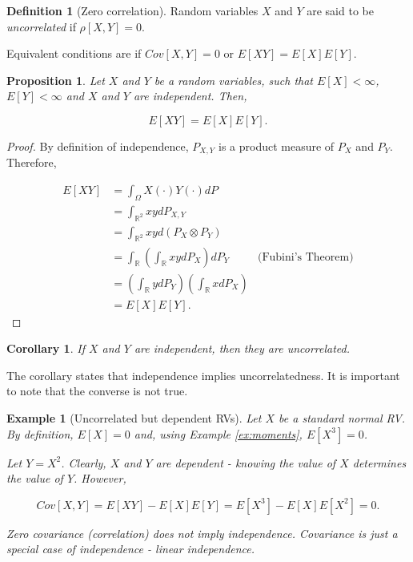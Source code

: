 \documentclass{book}
\theoremstyle{plain}%
\newtheorem{prototheorem}{Example}[section]
\newenvironment{cexample}
   {\colorlet{shadecolor}{gray!10}\begin{shaded}\begin{prototheorem}}
   {\end{prototheorem}\end{shaded}}
\newtheorem{corollary}{Corollary}[section]
\newtheorem{proposition}{Proposition}[section]
\theoremstyle{definition}
\newtheorem{definition}{Definition}[section]
\begin{document}
\begin{definition}[Zero correlation]
Random variables $X$ and $Y$ are said to be \emph{uncorrelated} if $\rho[X,Y] = 0$.

Equivalent conditions are if $Cov[X,Y] = 0$ or $E[XY] = E[X]E[Y]$.
\end{definition}

\begin{proposition}
Let $X$ and $Y$ be a random variables, such that $E[X] < \infty$, $E[Y] < \infty$ and $X$ and $Y$ are independent. Then,

$$E[XY] = E[X]E[Y].$$
\end{proposition}

\begin{proof}
By definition of independence, $P_{X,Y}$ is a product measure of $P_X$ and $P_Y$. Therefore,

\begin{align*}
E[XY] &= \int_\Omega X(\cdot)Y(\cdot) dP  \\
&= \int_{\mathbb{R}^2} x y dP_{X,Y} \\
&= \int_{\mathbb{R}^2} x y d(P_X \otimes P_Y) \\
&= \int_\mathbb{R} \left(\int_\mathbb{R} xy dP_X \right) dP_Y & \text{(Fubini's Theorem)} \\
&= \left(\int_\mathbb{R} y dP_Y \right)  \left(\int_\mathbb{R} x dP_X \right) \\
&= E[X]E[Y].
\end{align*}
\end{proof}

\begin{corollary}
If $X$ and $Y$ are independent, then they are uncorrelated.
\end{corollary}

The corollary states that independence implies uncorrelatedness. It is important to note that the converse is not true.

\begin{cexample}[Uncorrelated but dependent RVs]
Let $X$ be a standard normal RV. By definition, $E[X] = 0$ and, using Example \ref{ex:moments}, $E[X^3] = 0$.

Let $Y = X^2$. Clearly, $X$ and $Y$ are dependent - knowing the value of $X$ determines the value of $Y$. However,

$$Cov[X,Y] = E[XY] - E[X]E[Y] = E[X^3] - E[X]E[X^2] = 0.$$

Zero covariance (correlation) does not imply independence. Covariance is just a special case of independence - linear independence.
\end{cexample}
\end{document}

